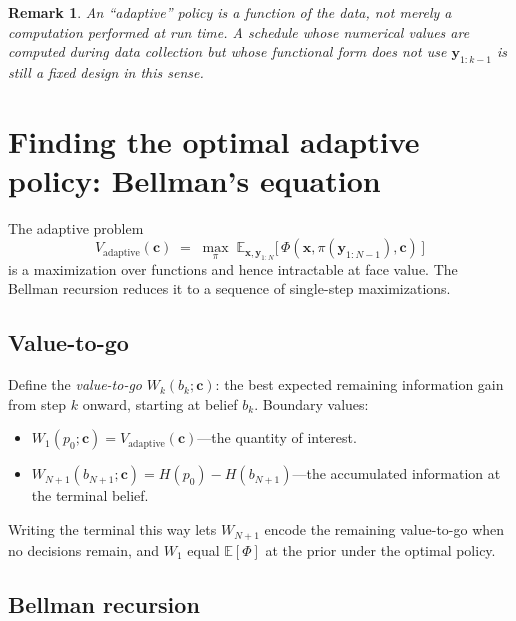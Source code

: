 \documentclass[11pt,a4paper]{article}
\newcommand{\E}{\mathbb{E}}
\newtheorem{remark}{Remark}
\begin{document}
\begin{remark}
An ``adaptive'' policy is a \emph{function} of the data, not merely a computation performed at run time.  A schedule whose numerical values are computed during data collection but whose \emph{functional form} does not use $\bm{y}_{1:k-1}$ is still a fixed design in this sense.
\end{remark}

\section{Finding the optimal adaptive policy: Bellman's equation}
\label{sec:bellman}

The adaptive problem
\begin{equation}
  V_{\mathrm{adaptive}}(\bm{c}) \;=\; \max_{\pi} \; \E_{\bm{x}, \bm{y}_{1:N}}\!\bigl[\,\Phi(\bm{x}, \pi(\bm{y}_{1:N-1}), \bm{c})\,\bigr]
  \label{eq:vadapt}
\end{equation}
is a maximization over functions and hence intractable at face value.  The Bellman recursion reduces it to a sequence of single-step maximizations.

\subsection{Value-to-go}

Define the \emph{value-to-go} $W_k(b_k; \bm{c})$: the best expected remaining information gain from step $k$ onward, starting at belief $b_k$.  Boundary values:
\begin{itemize}[nosep]
  \item $W_1(p_0; \bm{c}) = V_{\mathrm{adaptive}}(\bm{c})$---the quantity of interest.
  \item $W_{N+1}(b_{N+1}; \bm{c}) = H(p_0) - H(b_{N+1})$---the accumulated information at the terminal belief.
\end{itemize}
Writing the terminal this way lets $W_{N+1}$ encode the remaining value-to-go when no decisions remain, and $W_1$ equal $\E[\Phi]$ at the prior under the optimal policy.

\subsection{Bellman recursion}
\end{document}
